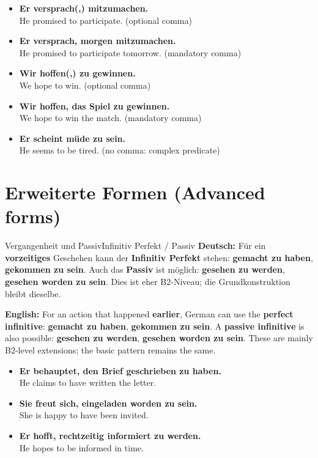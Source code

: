 \documentclass[a4paper,11pt]{article}
\newcommand{\GermanText}[1]{\textbf{Deutsch: }#1\par}
\newcommand{\EnglishText}[1]{{\small\color{SoftGray}\textbf{English: }#1\par}}
\newcommand{\ExampleItem}[2]{\item \textbf{#1}\\{\small\color{SoftGray}#2}}
\begin{document}
\begin{exbox}\begin{itemize}
\ExampleItem{Er versprach(,) mitzumachen.}{He promised to participate. (optional comma)}
\ExampleItem{Er versprach, morgen mitzumachen.}{He promised to participate tomorrow. (mandatory comma)}
\ExampleItem{Wir hoffen(,) zu gewinnen.}{We hope to win. (optional comma)}
\ExampleItem{Wir hoffen, das Spiel zu gewinnen.}{We hope to win the match. (mandatory comma)}
\ExampleItem{Er scheint müde zu sein.}{He seems to be tired. (no comma: complex predicate)}
\end{itemize}\end{exbox}

\section{Erweiterte Formen \textnormal{(Advanced forms)}}
\begin{grammarentry}{Vergangenheit und Passiv}{Infinitiv Perfekt / Passiv}
\GermanText{Für ein \textbf{vorzeitiges} Geschehen kann der \textbf{Infinitiv Perfekt} stehen: \textbf{gemacht zu haben}, \textbf{gekommen zu sein}. Auch das \textbf{Passiv} ist möglich: \textbf{gesehen zu werden}, \textbf{gesehen worden zu sein}. Dies ist eher B2-Niveau; die Grundkonstruktion bleibt dieselbe.}
\EnglishText{For an action that happened \textbf{earlier}, German can use the \textbf{perfect infinitive}: \textbf{gemacht zu haben}, \textbf{gekommen zu sein}. A \textbf{passive infinitive} is also possible: \textbf{gesehen zu werden}, \textbf{gesehen worden zu sein}. These are mainly B2-level extensions; the basic pattern remains the same.}
\end{grammarentry}
\begin{exbox}\begin{itemize}
\ExampleItem{Er behauptet, den Brief geschrieben zu haben.}{He claims to have written the letter.}
\ExampleItem{Sie freut sich, eingeladen worden zu sein.}{She is happy to have been invited.}
\ExampleItem{Er hofft, rechtzeitig informiert zu werden.}{He hopes to be informed in time.}
\end{itemize}\end{exbox}
\end{document}
